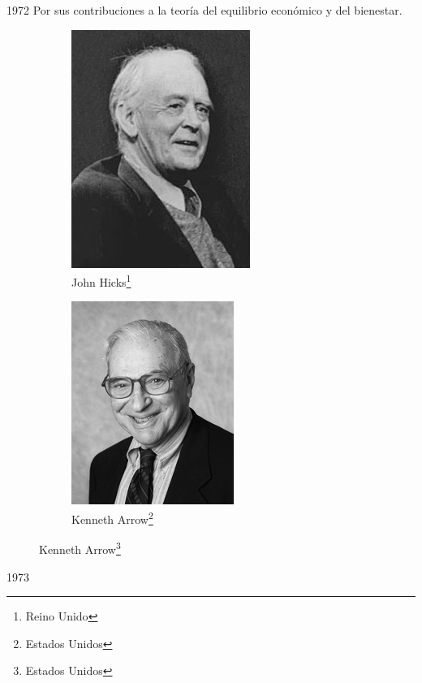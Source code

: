 \documentclass[aspectratio=169]{beamer}
\begin{document}
        \begin{frame}[t]{1972}
            \justify
            Por sus contribuciones a la teoría del equilibrio económico y del bienestar.
            \begin{figure}[ht]
                \centering
                \caption{Ganadores del Premio Nobel de Economía en 1972}
                \begin{subfigure}[b]{0.49\textwidth}
                    \centering
                    \includegraphics[scale = 0.35]{Img/JohnHicks.jpg}
                    \caption{John Hicks\footnote{Reino Unido}}
                    \label{fig: JohnHicks}
                \end{subfigure}
                \hfill 
                \begin{subfigure}[b]{0.49\textwidth}
                    \centering
                    \includegraphics[scale = 1.7]{Img/KennethArrow.jpg}
                    \caption{Kenneth Arrow\footnote{Estados Unidos}}
                    \label{fig: KennethArrow}
                \end{subfigure}
                \label{fig: Ganadores1972}
            \end{figure}
        \end{frame}
        \begin{frame}[t]{1973}
            
        \end{frame}


    
\end{document}
